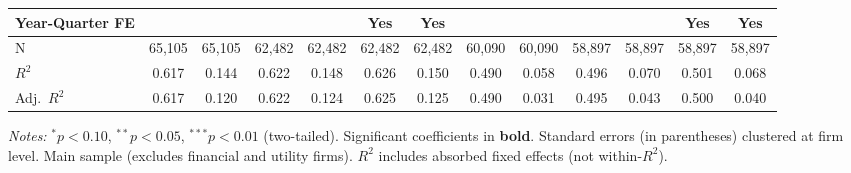 \documentclass[11pt,a4paper]{article}
\begin{document}
\begin{table}[htbp]
\begin{tabular}{lcccccccccccc}
Year-Quarter FE &  &  &  &  & Yes & Yes &  &  &  &  & Yes & Yes \\
\midrule
N & 65,105 & 65,105 & 62,482 & 62,482 & 62,482 & 62,482 & 60,090 & 60,090 & 58,897 & 58,897 & 58,897 & 58,897 \\
$R^2$ & 0.617 & 0.144 & 0.622 & 0.148 & 0.626 & 0.150 & 0.490 & 0.058 & 0.496 & 0.070 & 0.501 & 0.068 \\
Adj.~$R^2$ & 0.617 & 0.120 & 0.622 & 0.124 & 0.625 & 0.125 & 0.490 & 0.031 & 0.495 & 0.043 & 0.500 & 0.040 \\
\bottomrule
\end{tabular}
\begin{minipage}{\linewidth}
\vspace{2pt}\scriptsize
\textit{Notes:} $^{*}p<0.10$, $^{**}p<0.05$, $^{***}p<0.01$ (two-tailed).
 Significant coefficients in \textbf{bold}.
 Standard errors (in parentheses) clustered at firm level.
 Main sample (excludes financial and utility firms).
 $R^2$ includes absorbed fixed effects (not within-$R^2$).
\end{minipage}
\end{table}
\clearpage
\end{document}
